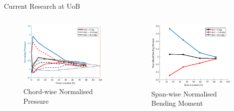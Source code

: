 \documentclass[aspectratio=169]{beamer}            %
\begin{document}
\begin{frame}[plain]

  \centering
	
\end{frame}
\begin{frame}{Current Research at UoB}

  \vspace{-1.5em}
	\begin{columns}
	  \begin{column}{0.5\textwidth}
		  \begin{figure}[!htb]
        \centering
				\includegraphics[height=0.6\textwidth]{PressureCoeffDistribution.eps}
				\caption{Chord-wise Normalised Pressure}
				\label{fig:CharSignals_Pressure}
      \end{figure}
		\end{column}
    \begin{column}{0.5\textwidth}
		  \begin{figure}[!htb]
        \centering
				\includegraphics[height=0.6\textwidth]{BendingMomentDistribution.eps}
				\caption{Span-wise Normalised Bending Moment}
				\label{fig:CharSignals_Bending}
      \end{figure}
		\end{column}
	\end{columns}


\end{frame}
\end{document}
